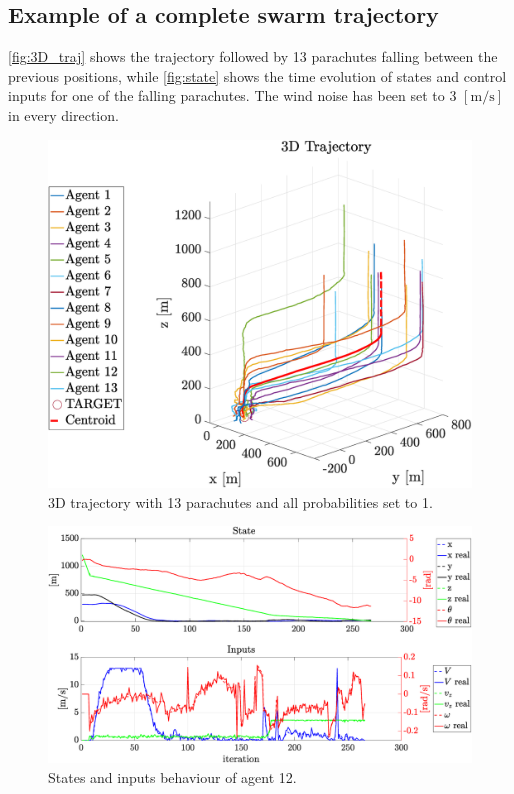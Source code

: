 \subsection{Example of a complete swarm trajectory}\label{subsec:complete_sim}
\autoref{fig:3D_traj} shows the trajectory followed by 13 parachutes falling between the previous positions, while \autoref{fig:state} shows the time evolution of states and control inputs for one of the falling parachutes. The wind noise has been set to 3 $\left[\si{\meter\per\second}\right]$ in every direction.
\begin{figure}[h]
    \centering
    \includegraphics[width=\columnwidth]{images/fig_3D.eps}
    \caption{3D trajectory with 13 parachutes and all probabilities set to 1.}
    \label{fig:3D_traj}
\end{figure}
\begin{figure}[h]
    \centering
    \includegraphics[width=\columnwidth]{images/fig_1.eps}
    \caption{States and inputs behaviour of agent 12.}
    \label{fig:state}
\end{figure}
